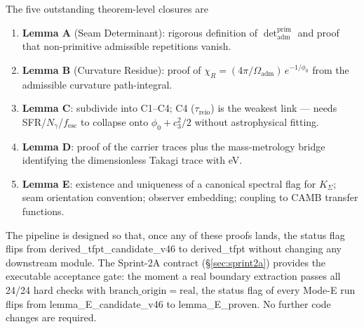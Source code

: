 The five outstanding theorem-level closures are
\begin{enumerate}[leftmargin=1.4em]
\item \textbf{Lemma A} (Seam Determinant): rigorous definition of
\(\det_{\mathrm{adm}}^{\mathrm{prim}}\) and proof that
non-primitive admissible repetitions vanish.
\item \textbf{Lemma B} (Curvature Residue): proof of
\(\chi_R = (4\pi/\Omega_{\mathrm{adm}})\,e^{-1/\phi_0}\) from the
admissible curvature path-integral.
\item \textbf{Lemma C}: subdivide into C1--C4; C4 (\(\tau_{\mathrm{reio}}\))
is the weakest link --- needs SFR/\(N_\gamma\)/\(f_{\mathrm{esc}}\) to
collapse onto \(\phi_0+c_3^2/2\) without astrophysical fitting.
\item \textbf{Lemma D}: proof of the carrier traces plus the
mass-metrology bridge identifying the dimensionless Takagi trace with
eV.
\item \textbf{Lemma E}: existence and uniqueness of a canonical
spectral flag for \(K_\Sigma\); seam orientation convention; observer
embedding; coupling to CAMB transfer functions.
\end{enumerate}

The pipeline is designed so that, once any of these proofs lands, the
status flag flips from \textsf{derived\_tfpt\_candidate\_v46} to
\textsf{derived\_tfpt} without changing any downstream module.  The
Sprint-2A contract (\S\ref{sec:sprint2a}) provides the executable
acceptance gate: the moment a real boundary extraction passes all
24/24 hard checks with \(\mathrm{branch\_origin}=\mathrm{real}\), the
status flag of every Mode-E run flips from
\textsf{lemma\_E\_candidate\_v46} to
\textsf{lemma\_E\_proven}.  No further code changes are required.

